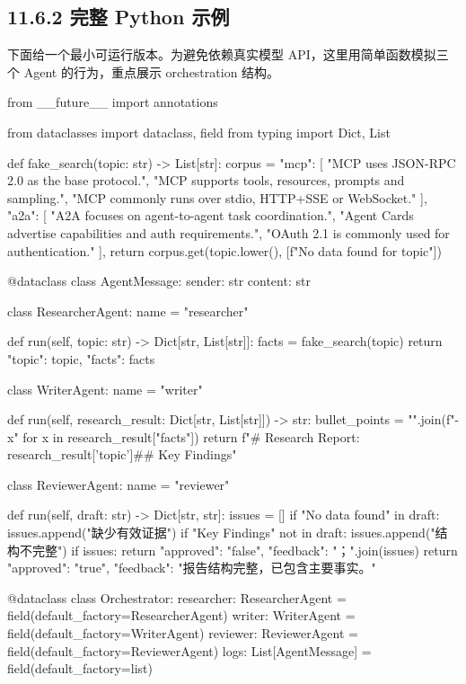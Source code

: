 \subsection{11.6.2 完整 Python 示例}

下面给一个最小可运行版本。为避免依赖真实模型 API，这里用简单函数模拟三个 Agent 的行为，重点展示 orchestration 结构。


\begin{codeblock}
from __future__ import annotations

from dataclasses import dataclass, field
from typing import Dict, List


def fake_search(topic: str) -> List[str]:
    corpus = {
        "mcp": [
            "MCP uses JSON-RPC 2.0 as the base protocol.",
            "MCP supports tools, resources, prompts and sampling.",
            "MCP commonly runs over stdio, HTTP+SSE or WebSocket."
        ],
        "a2a": [
            "A2A focuses on agent-to-agent task coordination.",
            "Agent Cards advertise capabilities and auth requirements.",
            "OAuth 2.1 is commonly used for authentication."
        ],
    }
    return corpus.get(topic.lower(), [f"No data found for {topic}"])


@dataclass
class AgentMessage:
    sender: str
    content: str


class ResearcherAgent:
    name = "researcher"

    def run(self, topic: str) -> Dict[str, List[str]]:
        facts = fake_search(topic)
        return {"topic": topic, "facts": facts}


class WriterAgent:
    name = "writer"

    def run(self, research_result: Dict[str, List[str]]) -> str:
        bullet_points = "\n".join(f"- {x}" for x in research_result["facts"])
        return f"# Research Report: {research_result['topic']}\n\n## Key Findings\n"


class ReviewerAgent:
    name = "reviewer"

    def run(self, draft: str) -> Dict[str, str]:
        issues = []
        if "No data found" in draft:
            issues.append("缺少有效证据")
        if "Key Findings" not in draft:
            issues.append("结构不完整")
        if issues:
            return {"approved": "false", "feedback": "；".join(issues)}
        return {"approved": "true", "feedback": "报告结构完整，已包含主要事实。"}


@dataclass
class Orchestrator:
    researcher: ResearcherAgent = field(default_factory=ResearcherAgent)
    writer: WriterAgent = field(default_factory=WriterAgent)
    reviewer: ReviewerAgent = field(default_factory=ReviewerAgent)
    logs: List[AgentMessage] = field(default_factory=list)


\end{codeblock}
